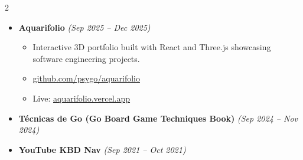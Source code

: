 \documentclass[12pt]{extarticle}
\renewcommand{\_}{\leavevmode\kern.06em\vbox{\hrule width.425em}}
\begin{document}
\begin{multicols}{2}
\begin{itemize}
  \item \textbf{Aquarifolio} \textit{(Sep 2025 -- Dec 2025)}
    \begin{itemize}
      \item Interactive 3D portfolio built with React and Three.js showcasing software engineering projects.
      \item \href{https://github.com/psygo/aquarifolio}{github.com/psygo/aquarifolio}
      \item Live: \href{https://aquarifolio.vercel.app}{aquarifolio.vercel.app}
    \end{itemize}

  \item \textbf{T\'ecnicas de Go (Go Board Game Techniques Book)} \textit{(Sep 2024 -- Nov 2024)}

  \item \textbf{YouTube KBD Nav} \textit{(Sep 2021 -- Oct 2021)}


\end{itemize}
\end{multicols}
\end{document}
